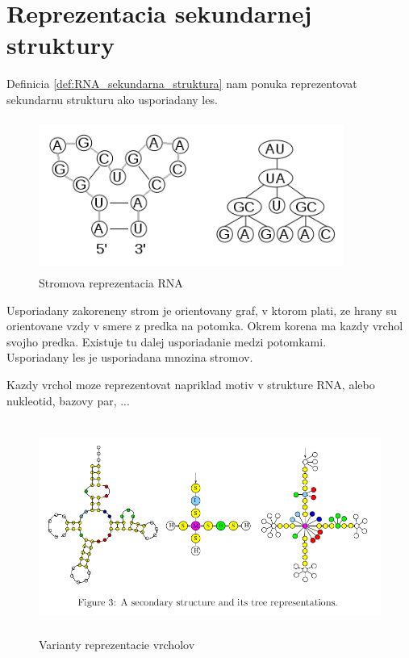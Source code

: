 \section{Reprezentacia sekundarnej struktury}

Definicia \ref{def:RNA_sekundarna_struktura} nam ponuka reprezentovat sekundarnu strukturu
ako usporiadany les.

\begin{figure}[H]
\centering
\includegraphics[width=100mm, height=50mm]{../img/rna_to_tree.png}
\caption{Stromova reprezentacia RNA}
\label{obr:RNA_stromova_reprezentacia}
\end{figure}

\begin{definice}\label{def:strom}
	Usporiadany zakoreneny strom je orientovany graf, v ktorom plati, ze hrany su orientovane
	vzdy v smere z predka na potomka. Okrem korena ma kazdy vrchol svojho predka. Existuje tu
	dalej usporiadanie medzi potomkami.
	\\
	Usporiadany les je usporiadana mnozina stromov.
\end{definice}

Kazdy vrchol moze reprezentovat napriklad motiv v strukture RNA, alebo nukleotid, bazovy par, ...

\begin{figure}[H]
\centering
\includegraphics[width=130mm, height=70mm]{../img/stromova_reprezentacia_rna.png}
\caption{Varianty reprezentacie vrcholov}
\label{obr:RNA_vrcholy}
\end{figure}






